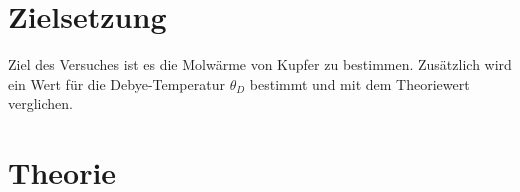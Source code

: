 \section{Zielsetzung}
\label{sec:Zielsetzung}

Ziel des Versuches ist es die Molwärme von Kupfer zu bestimmen. Zusätzlich wird ein Wert für die Debye-Temperatur $\theta_D$ bestimmt und mit dem Theoriewert verglichen.


\section{Theorie}
\label{sec:Theorie}
